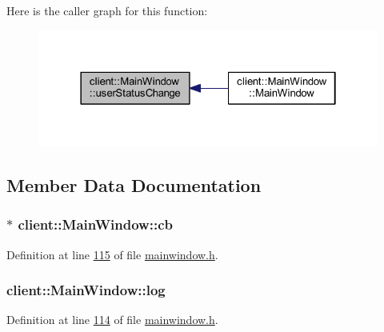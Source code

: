 Here is the caller graph for this function\-:
\nopagebreak
\begin{figure}[H]
\begin{center}
\leavevmode
\includegraphics[width=322pt]{d2/da4/classclient_1_1_main_window_a380097fa1faba7f0457886053f793c59_icgraph}
\end{center}
\end{figure}




\subsection{Member Data Documentation}
\hypertarget{classclient_1_1_main_window_aa1e651adf78ed0a72d8c028a8263e17d}{
\subsubsection[{cb}]{$\ast$ client\-::\-Main\-Window\-::cb\hspace{0.3cm}{\ttfamily [private]}}}\label{d2/da4/classclient_1_1_main_window_aa1e651adf78ed0a72d8c028a8263e17d}


Definition at line \hyperlink{mainwindow_8h_source_l00115}{115} of file \hyperlink{mainwindow_8h_source}{mainwindow.\-h}.

\hypertarget{classclient_1_1_main_window_ad83b542f504d4d017661c0aa7ce630b7}{
\subsubsection[{log}]{ client\-::\-Main\-Window\-::log\hspace{0.3cm}{\ttfamily [private]}}}\label{d2/da4/classclient_1_1_main_window_ad83b542f504d4d017661c0aa7ce630b7}


Definition at line \hyperlink{mainwindow_8h_source_l00114}{114} of file \hyperlink{mainwindow_8h_source}{mainwindow.\-h}.


